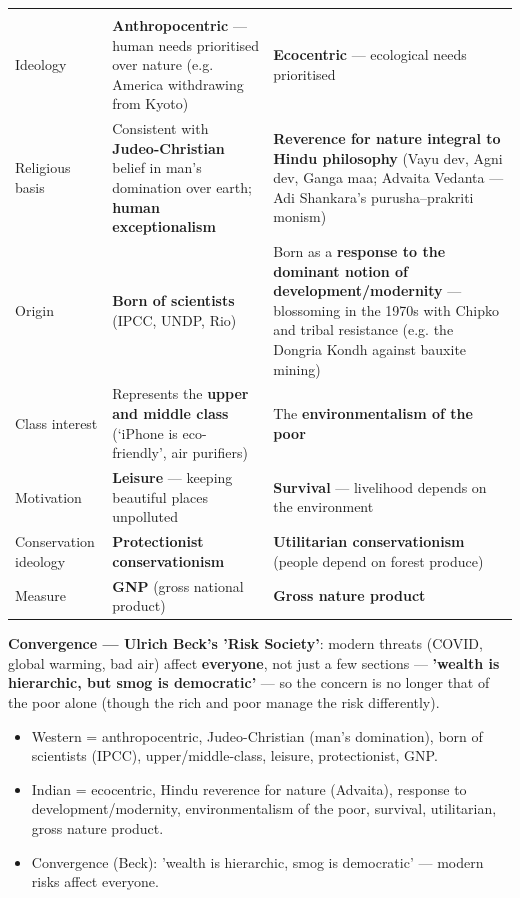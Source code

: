 \begin{center}
\begin{tabularx}{\textwidth}{YYY}
 &  &  \\
Ideology & \textbf{Anthropocentric} --- human needs prioritised over nature (e.g. America withdrawing from Kyoto) & \textbf{Ecocentric} --- ecological needs prioritised \\
Religious basis & Consistent with \textbf{Judeo-Christian} belief in man's domination over earth; \textbf{human exceptionalism} & \textbf{Reverence for nature integral to Hindu philosophy} (Vayu dev, Agni dev, Ganga maa; Advaita Vedanta --- Adi Shankara's purusha--prakriti monism) \\
Origin & \textbf{Born of scientists} (IPCC, UNDP, Rio) & Born as a \textbf{response to the dominant notion of development/modernity} --- blossoming in the 1970s with Chipko and tribal resistance (e.g. the Dongria Kondh against bauxite mining) \\
Class interest & Represents the \textbf{upper and middle class} (`iPhone is eco-friendly', air purifiers) & The \textbf{environmentalism of the poor} \\
Motivation & \textbf{Leisure} --- keeping beautiful places unpolluted & \textbf{Survival} --- livelihood depends on the environment \\
Conservation ideology & \textbf{Protectionist conservationism} & \textbf{Utilitarian conservationism} (people depend on forest produce) \\
Measure & \textbf{GNP} (gross national product) & \textbf{Gross nature product} \\
\end{tabularx}
\end{center}

\begin{KeyConcept}
\textbf{Convergence --- Ulrich Beck's 'Risk Society'}: modern threats (COVID, global warming, bad air) affect \textbf{everyone}, not just a few sections --- \textbf{'wealth is hierarchic, but smog is democratic'} --- so the concern is no longer that of the poor alone (though the rich and poor manage the risk differently).
\end{KeyConcept}

\begin{QuickRevision}
\begin{itemize}
\item Western = anthropocentric, Judeo-Christian (man's domination), born of scientists (IPCC), upper/middle-class, leisure, protectionist, GNP.
\item Indian = ecocentric, Hindu reverence for nature (Advaita), response to development/modernity, environmentalism of the poor, survival, utilitarian, gross nature product.
\item Convergence (Beck): 'wealth is hierarchic, smog is democratic' --- modern risks affect everyone.
\end{itemize}
\end{QuickRevision}

